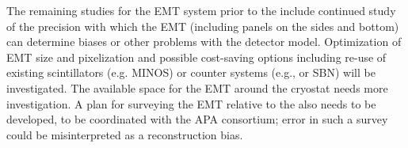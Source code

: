 





The remaining studies for the EMT system prior to the  include continued study of the precision with which the EMT (including panels on the sides and bottom) can determine biases or other problems with the detector model. Optimization of EMT size and pixelization and possible cost-saving options including re-use of existing scintillators (e.g. MINOS) or counter systems (e.g.,  or SBN) will be investigated. The available space for the EMT around the cryostat needs more investigation. A plan for surveying the EMT relative to the  also needs to be developed, to be coordinated with the APA consortium; error in such a survey could be misinterpreted as a reconstruction bias. %


